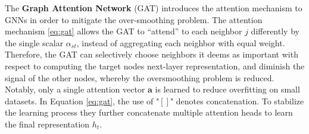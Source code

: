 The \textbf{Graph Attention Network} (GAT) \parencite{velivckovic2017graph} introduces the attention mechanism \parencite{bahdanau2014neural} to GNNs in order to mitigate  the over-smoothing problem. The attention mechanism \eqref{eq:gat} allows the GAT to “attend” to each neighbor $j$ differently by the single scalar $\alpha_{st}$, instead of aggregating each neighbor with equal weight. Therefore, the GAT can selectively choose neighbors it deems as important with respect to computing the target nodes next-layer representation, and diminish the signal of the other nodes, whereby the oversmoothing problem is reduced. Notably, only a single attention vector $\mathbf{a}$ is learned to reduce overfitting on small datasets. In Equation \eqref{eq:gat}, the use of "$[]$" denotes concatenation.  To stabilize the learning process they further concatenate multiple attention heads to learn the final representation ${h_t}$.












 